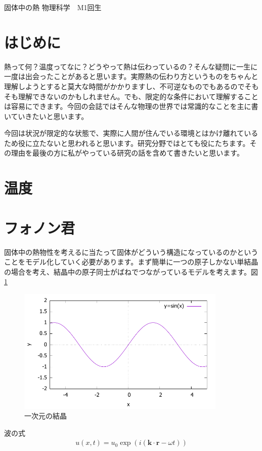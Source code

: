 \documentclass[10pt,b5paper,papersize,dvipdfmx]{jsbook}
\begin{document}


\kaishititle%
  {固体中の熱}%
  {物理科学　M1回生}%
  {}%

\section*{はじめに}
熱って何？温度ってなに？どうやって熱は伝わっているの？そんな疑問に一生に一度は出会ったことがあると思います。実際熱の伝わり方というものをちゃんと理解しようとすると莫大な時間がかかりますし、不可逆なものでもあるのでそもそも理解できないのかもしれません。でも、限定的な条件において理解することは容易にできます。今回の会誌ではそんな物理の世界では常識的なことを主に書いていきたいと思います。\par
今回は状況が限定的な状態で、実際に人間が住んでいる環境とはかけ離れているため役に立たないと思われると思います。研究分野ではとても役にたちます。その理由を最後の方に私がやっている研究の話を含めて書きたいと思います。


%
\section{温度}



\section{フォノン君}
固体中の熱物性を考えるに当たって固体がどういう構造になっているのかということをモデル化していく必要があります。まず簡単に一つの原子しかない単結晶の場合を考え、結晶中の原子同士がばねでつながっているモデルを考えます。図\ref{fig:bane}
\begin{figure}[htbp]
  \centering
  \includegraphics[width=10cm]{temp/fig-sin.pdf}
  \caption{一次元の結晶}
  \label{fig:bane}
\end{figure}
波の式
\begin{align}
  u(x,t) = u_0 \exp(i(\mathbf{k} \cdot \mathbf{r} - \omega t))
\end{align}
\end{document}
